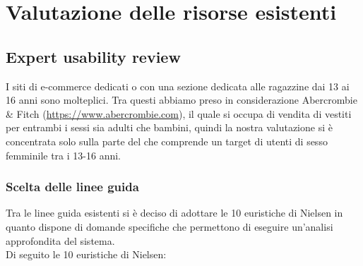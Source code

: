\documentclass[12pt,a4paper]{report}
\begin{document}
\chapter{Valutazione delle risorse esistenti}
\section{Expert usability review}
I siti di e-commerce dedicati o con una sezione dedicata alle ragazzine dai 13 ai 16 anni sono molteplici. Tra questi abbiamo preso in considerazione Abercrombie \& Fitch (\href{https://www.abercrombie.com}{https://www.abercrombie.com}), il quale si occupa di vendita di vestiti per entrambi i sessi sia adulti che bambini, quindi la nostra valutazione si è concentrata solo sulla parte del che comprende un target di utenti di sesso femminile tra i 13-16 anni.
\subsection{Scelta delle linee guida}
Tra le linee guida esistenti si è deciso di adottare le 10 euristiche di Nielsen in quanto dispone di domande specifiche che permettono di eseguire un'analisi approfondita del sistema.\\
Di seguito le 10 euristiche di Nielsen:
\end{document}
